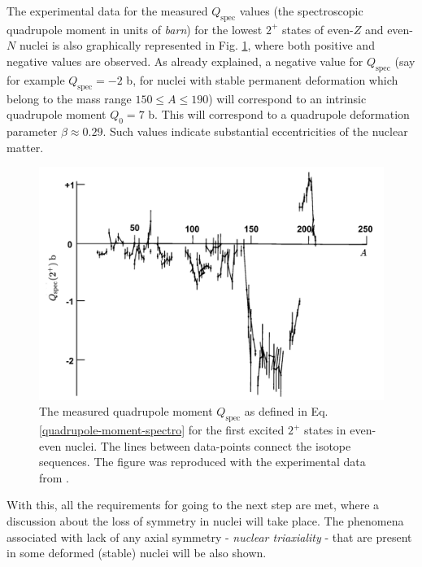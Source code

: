 The experimental data for the measured $Q_\text{spec}$ values (the spectroscopic quadrupole moment in units of \emph{barn}) for the lowest $2^+$ states of even-$Z$ and even-$N$ nuclei is also graphically represented in Fig. \ref{experimental-quadrupole-2Plus-states}, where both positive and negative values are observed. As already explained, a negative value for $Q_\text{spec}$ (say for example $Q_\text{spec}=-2$ b, for nuclei with stable permanent deformation which belong to the mass range $150\leq A \leq 190$) will correspond to an intrinsic quadrupole moment $Q_0=7$ b. This will correspond to a quadrupole deformation parameter $\beta\approx 0.29$. Such values indicate substantial eccentricities of the nuclear matter.

\begin{figure}
    \centering
    \includegraphics[scale=0.3]{Chapters/Figures/2Plus_spectroscopicQ.pdf}
    \caption{The measured quadrupole moment $Q_\text{spec}$ as defined in Eq. \ref{quadrupole-moment-spectro} for the first excited $2^+$ states in even-even nuclei. The lines between data-points connect the isotope sequences. The figure was reproduced with the experimental data from \cite{krane1991introductory}.}
    \label{experimental-quadrupole-2Plus-states}
\end{figure}

With this, all the requirements for going to the next step are met, where a discussion about the loss of symmetry in nuclei will take place. The phenomena associated with lack of any axial symmetry - \emph{nuclear triaxiality} - that are present in some deformed (stable) nuclei will be also shown.